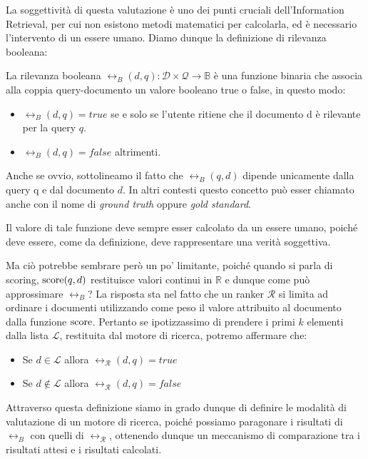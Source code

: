 La soggettività di questa valutazione è uno dei punti cruciali dell'Information Retrieval, per cui non esistono
metodi matematici per calcolarla, ed è necessario l'intervento di un essere umano.
Diamo dunque la definizione di rilevanza booleana:

\begin{definizione}\label{def:relb}
	La rilevanza booleana $\rel_B(d,q): \mathcal{D} \times \mathcal{Q} \rightarrow \mathbb{B}$
	è una funzione binaria che associa alla coppia query-documento un valore booleano
	true o false, in questo modo:
	\begin{itemize}
		\item		$\rel_B(d,q) = true$ se e solo se l'utente ritiene che il documento d è rilevante
		per la query $q$.
		\item $\rel_B(d,q) = false$ altrimenti.
	\end{itemize}
	
	Anche se ovvio, sottolineamo il fatto che $\rel_B(q,d)$ dipende unicamente dalla query q e
	dal documento $d$. In altri contesti questo concetto può esser chiamato anche con il nome
	di \textit{ground truth} oppure \textit{gold standard}.
\end{definizione}

Il valore di tale funzione deve sempre esser calcolato da un essere umano, poiché
deve essere, come da definizione, deve rappresentare una verità soggettiva.

Ma ciò potrebbe sembrare però un po' limitante, poiché quando si parla di scoring,
$\text{score}(q,d)$ restituisce valori continui in $\mathbb{R}$ e dunque come può
approssimare $\rel_B$?
La risposta sta nel fatto che un ranker $\mathcal{R}$ si limita ad ordinare i documenti utilizzando come peso
il valore attribuito al documento dalla funzione $\text{score}$. Pertanto se ipotizzassimo di prendere
i primi $k$ elementi dalla lista $\mathcal{L}$, restituita dal motore di ricerca, potremo affermare che:

\begin{itemize}
	\item Se $d \in \mathcal{L}$  allora $\rel_{\mathcal{R}}(d, q) = true$
	\item Se $d \notin \mathcal{L}$ allora $\rel_{\mathcal{R}}(d,q) = false$
\end{itemize}

Attraverso questa definizione siamo in grado dunque di definire le modalità di valutazione di
un motore di ricerca, poiché possiamo paragonare i risultati di $\rel_B$ con quelli di $\rel_{\mathcal{R}}$,
ottenendo dunque un meccanismo di comparazione tra i risultati attesi e i risultati calcolati.

